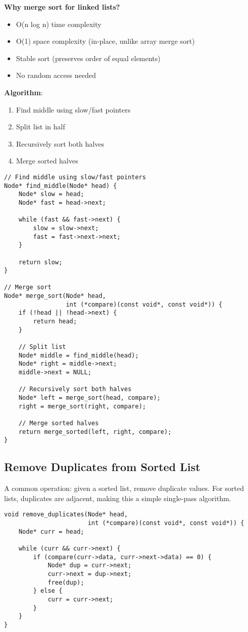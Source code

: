 \textbf{Why merge sort for linked lists?}
\begin{itemize}
    \item O(n log n) time complexity
    \item O(1) space complexity (in-place, unlike array merge sort)
    \item Stable sort (preserves order of equal elements)
    \item No random access needed
\end{itemize}

\textbf{Algorithm}:
\begin{enumerate}
    \item Find middle using slow/fast pointers
    \item Split list in half
    \item Recursively sort both halves
    \item Merge sorted halves
\end{enumerate}

\begin{lstlisting}
// Find middle using slow/fast pointers
Node* find_middle(Node* head) {
    Node* slow = head;
    Node* fast = head->next;

    while (fast && fast->next) {
        slow = slow->next;
        fast = fast->next->next;
    }

    return slow;
}

// Merge sort
Node* merge_sort(Node* head,
                 int (*compare)(const void*, const void*)) {
    if (!head || !head->next) {
        return head;
    }

    // Split list
    Node* middle = find_middle(head);
    Node* right = middle->next;
    middle->next = NULL;

    // Recursively sort both halves
    Node* left = merge_sort(head, compare);
    right = merge_sort(right, compare);

    // Merge sorted halves
    return merge_sorted(left, right, compare);
}
\end{lstlisting}

\subsection{Remove Duplicates from Sorted List}

A common operation: given a sorted list, remove duplicate values. For sorted lists, duplicates are adjacent, making this a simple single-pass algorithm.

\begin{lstlisting}
void remove_duplicates(Node* head,
                       int (*compare)(const void*, const void*)) {
    Node* curr = head;

    while (curr && curr->next) {
        if (compare(curr->data, curr->next->data) == 0) {
            Node* dup = curr->next;
            curr->next = dup->next;
            free(dup);
        } else {
            curr = curr->next;
        }
    }
}
\end{lstlisting}

